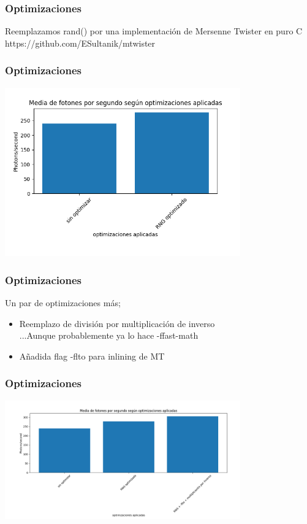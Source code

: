 \documentclass{beamer}
\begin{document}
\begin{frame}
    \frametitle{Optimizaciones}
        Reemplazamos rand() por una implementación de Mersenne Twister en puro C\\\pause
        https://github.com/ESultanik/mtwister
\end{frame}

\begin{frame}
    \frametitle{Optimizaciones}
    \includegraphics[width=4in]{imagenes/optimizacion_1.png}

\end{frame}

\begin{frame}
    \frametitle{Optimizaciones}
    Un par de optimizaciones más; \\\pause
    \begin{itemize}
        \item<1-> Reemplazo de división por multiplicación de inverso \\\pause
        ...Aunque probablemente ya lo hace -ffast-math \\\pause
        \item<2-> Añadida flag -flto para inlining de MT
       \end{itemize}
       
\end{frame}

\begin{frame}
    \frametitle{Optimizaciones}
    \includegraphics[width=4in]{imagenes/optimizacion_2.png}
\end{frame}
\end{document}
